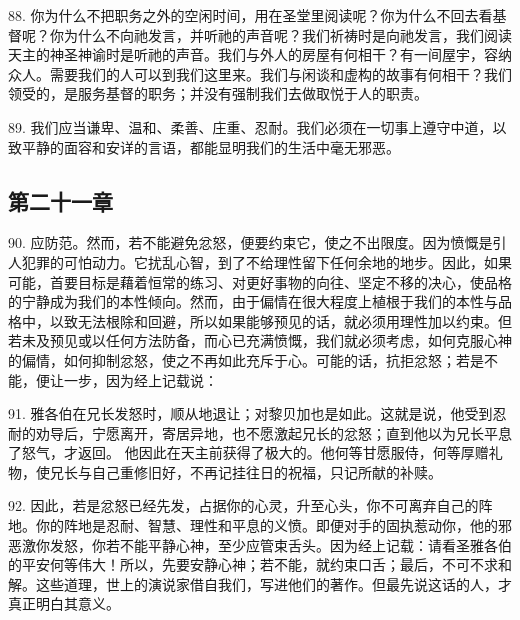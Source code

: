 88. 你为什么不把职务之外的空闲时间，用在圣堂里阅读呢？你为什么不回去看基督呢？你为什么不向祂发言，并听祂的声音呢？我们祈祷时是向祂发言，我们阅读天主的神圣神谕时是听祂的声音。我们与外人的房屋有何相干？有一间屋宇，容纳众人。需要我们的人可以到我们这里来。我们与闲谈和虚构的故事有何相干？我们领受的，是服务基督的职务；并没有强制我们去做取悦于人的职责。\par

89. 我们应当谦卑、温和、柔善、庄重、忍耐。我们必须在一切事上遵守中道，以致平静的面容和安详的言语，都能显明我们的生活中毫无邪恶。\par


\subsection{第二十一章}

\par

90. 应防范。然而，若不能避免忿怒，便要约束它，使之不出限度。因为愤慨是引人犯罪的可怕动力。它扰乱心智，到了不给理性留下任何余地的地步。因此，如果可能，首要目标是藉着恒常的练习、对更好事物的向往、坚定不移的决心，使品格的宁静成为我们的本性倾向。然而，由于偏情在很大程度上植根于我们的本性与品格中，以致无法根除和回避，所以如果能够预见的话，就必须用理性加以约束。但若未及预见或以任何方法防备，而心已充满愤慨，我们就必须考虑，如何克服心神的偏情，如何抑制忿怒，使之不再如此充斥于心。可能的话，抗拒忿怒；若是不能，便让一步，因为经上记载说：\par

91. 雅各伯在兄长发怒时，顺从地退让；对黎贝加也是如此。这就是说，他受到忍耐的劝导后，宁愿离开，寄居异地，也不愿激起兄长的忿怒；直到他以为兄长平息了怒气，才返回。 他因此在天主前获得了极大的。他何等甘愿服侍，何等厚赠礼物，使兄长与自己重修旧好，不再记挂往日的祝福，只记所献的补赎。\par

92. 因此，若是忿怒已经先发，占据你的心灵，升至心头，你不可离弃自己的阵地。你的阵地是忍耐、智慧、理性和平息的义愤。即便对手的固执惹动你，他的邪恶激你发怒，你若不能平静心神，至少应管束舌头。因为经上记载：请看圣雅各伯的平安何等伟大！所以，先要安静心神；若不能，就约束口舌；最后，不可不求和解。这些道理，世上的演说家借自我们，写进他们的著作。但最先说这话的人，才真正明白其意义。\par

